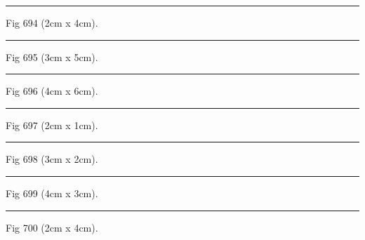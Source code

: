 \documentclass[a4paper,11pt]{article}
\begin{document}
\begin{swarmwrap}%
  \begin{minipage}[t]{2cm}
    \centering
    \rule{\linewidth}{4cm}
    {\footnotesize Fig 694 (2cm x 4cm).}
  \end{minipage}%
\end{swarmwrap}%
\swarmwrapnext
\lipsum[94]%

\begin{swarmwrap}%
  \begin{minipage}[t]{3cm}
    \centering
    \rule{\linewidth}{5cm}
    {\footnotesize Fig 695 (3cm x 5cm).}
  \end{minipage}%
\end{swarmwrap}%
\swarmwrapnext
\lipsum[95]%

\begin{swarmwrap}%
  \begin{minipage}[t]{4cm}
    \centering
    \rule{\linewidth}{6cm}
    {\footnotesize Fig 696 (4cm x 6cm).}
  \end{minipage}%
\end{swarmwrap}%
\swarmwrapnext
\lipsum[96]%

\begin{swarmwrap}%
  \begin{minipage}[t]{2cm}
    \centering
    \rule{\linewidth}{1cm}
    {\footnotesize Fig 697 (2cm x 1cm).}
  \end{minipage}%
\end{swarmwrap}%
\swarmwrapnext
\lipsum[97]%

\begin{swarmwrap}%
  \begin{minipage}[t]{3cm}
    \centering
    \rule{\linewidth}{2cm}
    {\footnotesize Fig 698 (3cm x 2cm).}
  \end{minipage}%
\end{swarmwrap}%
\swarmwrapnext
\lipsum[98]%

\begin{swarmwrap}%
  \begin{minipage}[t]{4cm}
    \centering
    \rule{\linewidth}{3cm}
    {\footnotesize Fig 699 (4cm x 3cm).}
  \end{minipage}%
\end{swarmwrap}%
\swarmwrapnext
\lipsum[99]%

\begin{swarmwrap}%
  \begin{minipage}[t]{2cm}
    \centering
    \rule{\linewidth}{4cm}
    {\footnotesize Fig 700 (2cm x 4cm).}
  \end{minipage}%
\end{swarmwrap}%
\swarmwrapnext
\lipsum[100]%
\end{document}
